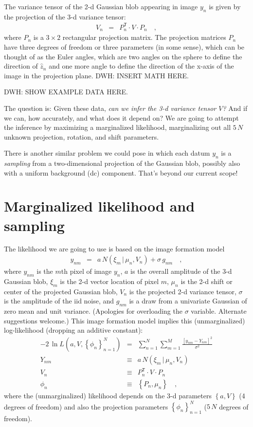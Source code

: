 \documentclass[12pt]{article}
\newcommand{\normal}{N}
\newcommand{\unitvec}[1]{\hat{#1}}
\newcommand{\zhat}{\unitvec{z}}
\newcommand{\transpose}{^{\mathsf{T}}}
\newcommand{\given}{\,|\,}
\newcommand{\like}{L}
\newcommand{\setof}[1]{\left\{{#1}\right\}}
\begin{document}
The variance tensor of the 2-d Gaussian blob appearing in image $y_n$
is given by the projection of the 3-d variance tensor:
\begin{eqnarray}
  V_n &=& P_n\transpose\cdot V\cdot P_n
  \quad ,
\end{eqnarray}
where $P_n$ is a $3\times 2$ rectangular projection matrix.
The projection matrices $P_n$ have three degrees of freedom or three
parameters (in some sense), which can be thought of as the Euler
angles, which are two angles on the sphere to define the direction of
$\zhat_n$ and one more angle to define the direction of the x-axis of
the image in the projection plane.
DWH: INSERT MATH HERE.

DWH: SHOW EXAMPLE DATA HERE.

The question is:
Given these data, \emph{can we infer the 3-d variance tensor $V$?}
And if we can, how accurately, and what does it depend on?
We are going to attempt the inference by maximizing a marginalized
likelihood, marginalizing out all $5\,N$ unknown projection, rotation,
and shift parameters.

There is another similar problem we could pose in which each datum
$y_n$ is a \emph{sampling} from a two-dimensional projection of the
Gaussian blob, possibly also with a uniform background (dc) component.
That's beyond our current scope!

\section{Marginalized likelihood and sampling}

The likelihood we are going to use is based on the image formation
model
\begin{eqnarray}
  y_{nm} &=& a\,\normal(\xi_m\given\mu_n,V_n) + \sigma\,g_{nm}
  \quad,
\end{eqnarray}
where $y_{nm}$ is the $m$th pixel of image $y_n$,
$a$ is the overall amplitude of the 3-d Gaussian blob,
$\xi_m$ is the 2-d vector location of pixel $m$,
$\mu_n$ is the 2-d shift or center of the projected Gaussian blob,
$V_n$ is the projected 2-d variance tensor,
$\sigma$ is the amplitude of the iid noise,
and $g_{nm}$ is a draw from a univariate Gaussian of zero mean and unit variance.
(Apologies for overloading the $\sigma$ variable.
Alternate suggestions welcome.)
This image formation model implies this (unmarginalized)
log-likelihood (dropping an additive constant):
\begin{eqnarray}
  -2\,\ln\like(a,V,\setof{\phi_n}_{n=1}^N) &=& \sum_{n=1}^N \sum_{m=1}^M \frac{[y_{nm} - Y_{nm}]^2}{\sigma^2}
  \\
  Y_{nm} &\equiv& a\,\normal(\xi_m\given\mu_n,V_n)
  \\
  V_n &\equiv& P_n\transpose\cdot V\cdot P_n
  \\
  \phi_n &\equiv& \setof{P_n, \mu_n}
  \quad,
\end{eqnarray}
where the (unmarginalized) likelihood depends on the 3-d parameters
$\setof{a,V}$ (4 degrees of freedom) and also the projection
parameters $\setof{\phi_n}_{n=1}^N$ ($5\,N$ degrees of freedom).
\end{document}
